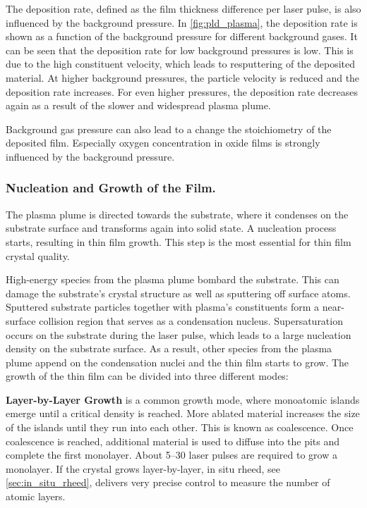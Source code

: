 The deposition rate, defined as the film thickness difference per laser pulse, is also 
influenced by the background pressure.
In \cref{fig:pld_plasma}, the deposition rate is shown as a function of the background
pressure for different background gases.
It can be seen that the deposition rate for low background pressures is low.
This is due to the high constituent velocity, which leads to resputtering of the
deposited material.
At higher background pressures, the particle velocity is reduced and the deposition
rate increases.
For even higher pressures, the deposition rate decreases again 
as a result of the slower and widespread plasma plume.

Background gas pressure can also lead to a change the stoichiometry of the deposited 
film.
Especially oxygen concentration in oxide films is strongly influenced by the
background pressure.

\subsubsection{Nucleation and Growth of the Film.}
The plasma plume is directed towards the substrate, where it condenses on 
the substrate surface and transforms again into solid state.
A nucleation process starts, resulting in thin film growth. 
This step is the most essential for thin film crystal quality.

High-energy species from the plasma plume bombard the substrate.
This can damage the substrate's crystal structure as well as sputtering off 
surface atoms.
Sputtered substrate particles together with plasma's constituents form a near-surface 
collision region that serves as a condensation nucleus. 
Supersaturation occurs on the substrate during the laser pulse, which leads to a
large nucleation density on the substrate surface.
As a result, other species from the plasma plume append on the condensation nuclei and
the thin film starts to grow.
The growth of the thin film can be divided into three different modes:

\textbf{Layer-by-Layer Growth} is a common growth mode, where monoatomic islands 
emerge until a critical density is reached. 
More ablated material increases the size of the islands until they run into each other.
This is known as coalescence. 
Once coalescence is reached, additional material is used to diffuse into the pits and
complete the first monolayer.
About \numrange{5}{30} laser pulses are required to grow a monolayer.
If the crystal grows layer-by-layer, in situ \acs*{rheed}, see \cref{sec:in_situ_rheed},
delivers very precise control to
measure the number of atomic layers. 

